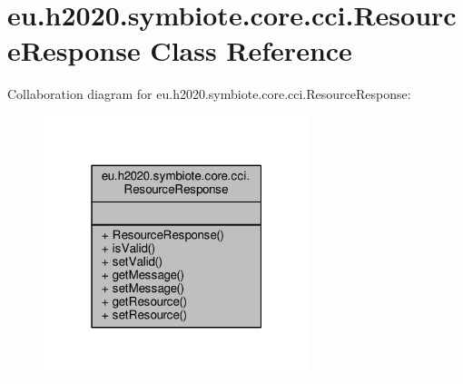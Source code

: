 \hypertarget{classeu_1_1h2020_1_1symbiote_1_1core_1_1cci_1_1ResourceResponse}{}\section{eu.\+h2020.\+symbiote.\+core.\+cci.\+Resource\+Response Class Reference}
\label{classeu_1_1h2020_1_1symbiote_1_1core_1_1cci_1_1ResourceResponse}


Collaboration diagram for eu.\+h2020.\+symbiote.\+core.\+cci.\+Resource\+Response\+:\nopagebreak
\begin{figure}[H]
\begin{center}
\leavevmode
\includegraphics[width=220pt]{classeu_1_1h2020_1_1symbiote_1_1core_1_1cci_1_1ResourceResponse__coll__graph}
\end{center}
\end{figure}
